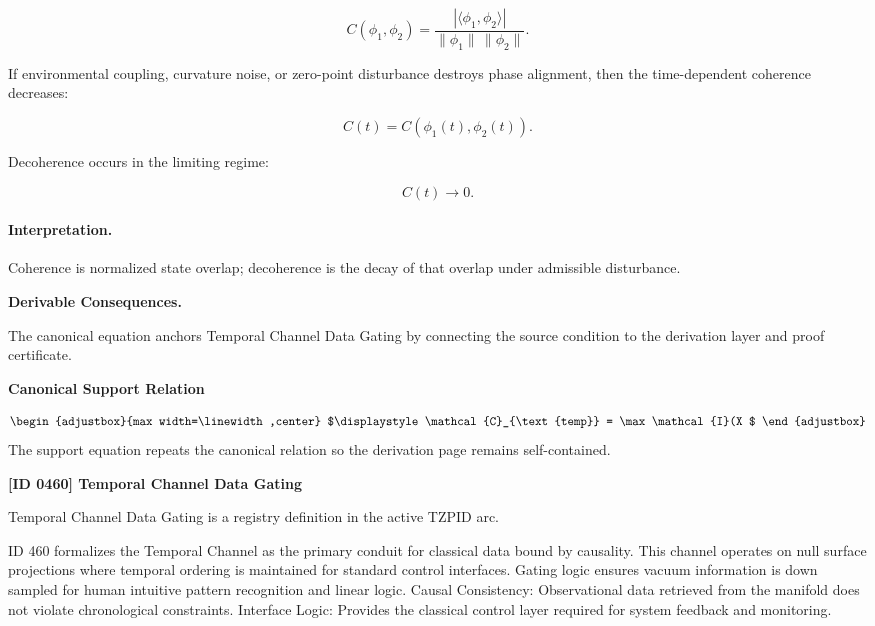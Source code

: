 \begin{equation}
C(\phi_1,\phi_2)
=
\frac{
|\langle \phi_1,\phi_2\rangle|
}{
\|\phi_1\|\,\|\phi_2\|
}.
\end{equation}

If environmental coupling, curvature noise, or zero-point disturbance destroys phase alignment, then the time-dependent coherence decreases:

\begin{equation}
C(t)
=
C(\phi_1(t),\phi_2(t)).
\end{equation}

Decoherence occurs in the limiting regime:

\begin{equation}
\boxed{
C(t)\rightarrow 0 .
}
\end{equation}

\paragraph{Interpretation.}
Coherence is normalized state overlap; decoherence is the decay of that overlap under admissible disturbance.

\par\vspace{0.35em}
\noindent\textbf{Derivable Consequences.}\quad
\begingroup
\footnotesize
\raggedright
The canonical equation anchors Temporal Channel Data Gating by connecting the source condition to the derivation layer and proof certificate.
\par\endgroup

\noindent\textbf{Canonical Support Relation}\par
\[
\begin{adjustbox}{max width=\linewidth,center}
$\displaystyle
\mathcal{C}_{\text{temp}} = \max \mathcal{I}(X
$
\end{adjustbox}
\]
\noindent The support equation repeats the canonical relation so the derivation page remains self-contained.\par

\clearpage
\noindent\textbf{[ID 0460] Temporal Channel Data Gating}\par
\vspace{0.35em}
\begingroup\small
{}
Temporal Channel Data Gating is a registry definition in the active TZPID arc.

ID 460 formalizes the Temporal Channel as the primary conduit for classical data bound by causality. This channel operates on null surface projections where temporal ordering is maintained for standard control interfaces. Gating logic ensures vacuum information is down sampled for human intuitive pattern recognition and linear logic. Causal Consistency: Observational data retrieved from the manifold does not violate chronological constraints. Interface Logic: Provides the classical control layer required for system feedback and monitoring.

